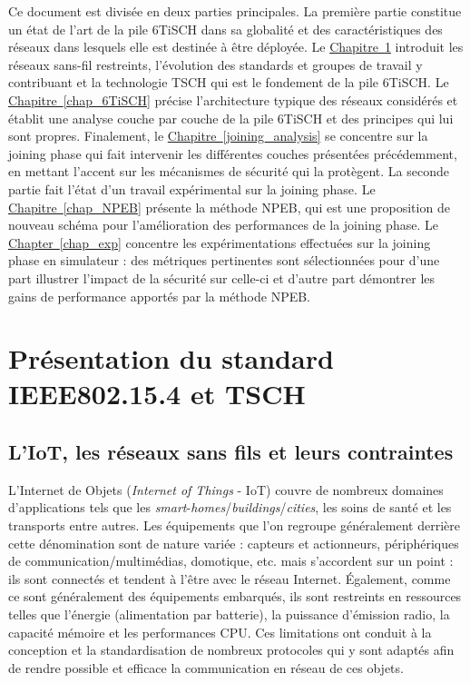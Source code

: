 \documentclass[]{report}
\newcommand{\wordlink}[2]{\hyperref[#2]{#1~\ref{#2}}}
\begin{document}
Ce document est divisée en deux parties principales. La première partie constitue un état de l'art de la pile 6TiSCH dans sa globalité et des caractéristiques des réseaux dans lesquels elle est destinée à être déployée. Le \wordlink{Chapitre}{chap_intro} introduit les réseaux sans-fil restreints, l'évolution des standards et groupes de travail y contribuant et la technologie TSCH qui est le fondement de la pile 6TiSCH. Le \wordlink{Chapitre}{chap_6TiSCH} précise l'architecture typique des réseaux considérés et établit une analyse couche par couche de la pile 6TiSCH et des principes qui lui sont propres. Finalement, le \wordlink{Chapitre}{joining_analysis} se concentre sur la joining phase qui fait intervenir les différentes couches présentées précédemment, en mettant l'accent sur les mécanismes de sécurité qui la protègent. La seconde partie fait l'état d'un travail expérimental sur la joining phase. Le \wordlink{Chapitre}{chap_NPEB} présente la méthode NPEB, qui est une proposition de nouveau schéma pour l'amélioration des performances de la joining phase. Le \wordlink{Chapter}{chap_exp} concentre les expérimentations effectuées sur la joining phase en simulateur : des métriques pertinentes sont sélectionnées pour d'une part illustrer l'impact de la sécurité sur celle-ci et d'autre part démontrer les gains de performance apportés par la méthode NPEB.



\chapter{Présentation du standard IEEE802.15.4 et TSCH}
\label{chap_intro}
\newpage

\section{L'IoT, les réseaux sans fils et leurs contraintes}
\label{WSNs}

L'Internet de Objets (\textit{Internet of Things }- IoT) couvre de nombreux domaines d'applications tels que les \textit{smart}-\textit{homes}/\textit{buildings}/\textit{cities}, les soins de santé et les transports entre autres. Les équipements que l'on regroupe généralement derrière cette dénomination sont de nature variée : capteurs et actionneurs, périphériques de communication/multimédias, domotique, etc. mais s'accordent sur un point : ils sont connectés et tendent à l'être avec le réseau Internet. Également, comme ce sont généralement des équipements embarqués, ils sont restreints en ressources telles que l'énergie (alimentation par batterie), la puissance d'émission radio, la capacité mémoire et les performances CPU. Ces limitations ont conduit à la conception et la standardisation de nombreux protocoles qui y sont adaptés afin de rendre possible et efficace la communication en réseau de ces objets.\\
\end{document}
